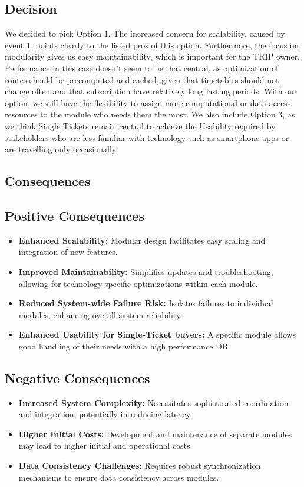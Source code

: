 \subsection*{Decision}
We decided to pick Option 1. The increased concern for scalability, caused by event 1, points clearly to the listed pros of this option. Furthermore, the focus on modularity
gives us easy maintainability, which is important for the TRIP owner.
Performance in this case doesn't seem to be that central, as optimization of routes should be precomputed and cached, given that timetables should not change often and that subscription have relatively long lasting periods.
With our option, we still have the flexibility to assign more computational or data access resources to the module who needs them the most.
We also include Option 3, as we think Single Tickets remain central to achieve the Usability required by stakeholders who are less familiar with technology such as smartphone apps or are travelling only occasionally.

\subsection*{Consequences}
\subsection*{Positive Consequences}

\begin{itemize}[noitemsep]
    \item \textbf{Enhanced Scalability:} Modular design facilitates easy scaling and integration of new features.
    \item \textbf{Improved Maintainability:} Simplifies updates and troubleshooting, allowing for technology-specific optimizations within each module.
    \item \textbf{Reduced System-wide Failure Risk:} Isolates failures to individual modules, enhancing overall system reliability.
    \item \textbf{Enhanced Usability for Single-Ticket buyers:} A specific module allows good handling of their needs with a high performance DB.
\end{itemize}

\subsection*{Negative Consequences}

\begin{itemize}[noitemsep]
    \item \textbf{Increased System Complexity:} Necessitates sophisticated coordination and integration, potentially introducing latency.
    \item \textbf{Higher Initial Costs:} Development and maintenance of separate modules may lead to higher initial and operational costs.
    \item \textbf{Data Consistency Challenges:} Requires robust synchronization mechanisms to ensure data consistency across modules.
\end{itemize}

